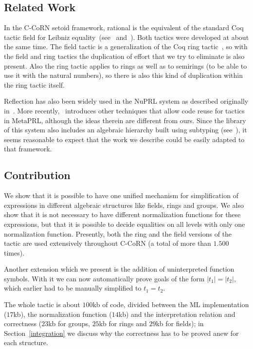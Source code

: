 \documentclass[runningheads]{llncs}
\newcommand{\tacticname}[1]{\textsf{#1}}
\newcommand{\rational}{\tacticname{rational}}
\begin{document}
\subsection{Related Work}

In the C-CoRN setoid framework, {\rational} is the equivalent of the standard Coq
tactic \tacticname{field} for Leibniz equality~(see~\cite{del:may:01} and~\cite[Chapter~8.11]{coqmanual}).
Both tactics were developed at about the same time.
The \tacticname{field} tactic is a generalization of the Coq \tacticname{ring}
tactic~\cite[Chapter~19]{coqmanual}, so with the \tacticname{field}
and \tacticname{ring} tactics the duplication of effort that we try to
eliminate is also present.  Also the \tacticname{ring} tactic applies
to rings as well as to semirings (to be able to use it with the
natural numbers), so there is also this kind of duplication within the
\tacticname{ring} tactic itself.

Reflection has also been widely used in the NuPRL system as described
originally in~\cite{ACHA90}.  More recently,~\cite{HNC+03} introduces
other techniques that allow code reuse for tactics in MetaPRL,
although the ideas therein are different from ours.  Since the library
of this system also includes an algebraic hierarchy built using
subtyping (see~\cite{YNKH03}), it seems reasonable to expect that the
work we describe could be easily adapted to that framework.

\subsection{Contribution}

We show that it is possible to have one unified mechanism for
simplification of expressions in different algebraic structures like
fields, rings and groups.
We also show that it is not necessary to have different normalization
functions for these expressions, but that it is possible to decide
equalities on all levels with only one normalization function.
Presently, both the ring and the field versions of the tactic are used
extensively throughout C-CoRN (a total of more than $1.500$ times).

Another extension which we present is the addition of uninterpreted
function symbols.  With it we can now automatically prove goals of the
form $|t_1|=|t_2|$, which earlier had to be manually simplified to
$t_1=t_2$.

The whole tactic is about $100$kb of code, divided between the ML
implementation ($17$kb), the normalization function ($14$kb) and
the interpretation relation and correctness ($23$kb for groups,
$25$kb for rings and $29$kb for fields); in Section~\ref{integration}
we discuss why the correctness has to be proved anew for each structure.
\end{document}
